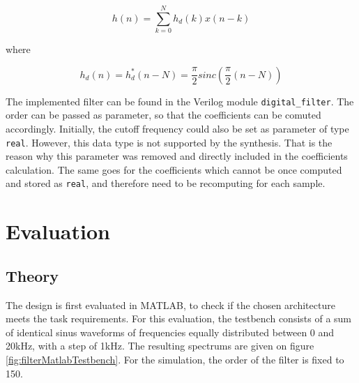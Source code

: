 \[
h(n) = \sum_{k=0}^{N} h_d(k) x(n-k)
\]

where

\[
h_d(n) = h_d^*(n-N) = \frac{\pi}{2} sinc(\frac{\pi}{2} (n-N))
\]

The implemented filter can be found in the Verilog module \texttt{digital\_filter}. The order can be passed as parameter, so that the coefficients can be comuted accordingly. Initially, the cutoff frequency could also be set as parameter of type \texttt{real}. However, this data type is not supported by the synthesis. That is the reason why this parameter was removed and directly included in the coefficients calculation. The same goes for the coefficients which cannot be once computed and stored as \texttt{real}, and therefore need to be recomputing for each sample.

\section{Evaluation}

\subsection{Theory}

The design is first evaluated in MATLAB, to check if the chosen architecture meets the task requirements. For this evaluation, the testbench consists of a sum of identical sinus waveforms of frequencies equally distributed between 0 and 20kHz, with a step of 1kHz. The resulting spectrums are given on figure \ref{fig:filterMatlabTestbench}. For the simulation, the order of the filter is fixed to 150.


